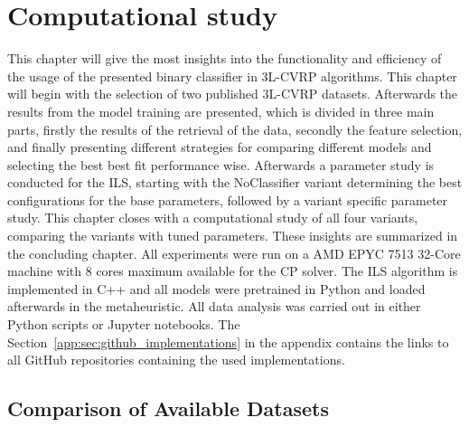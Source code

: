 \chapter{Computational study}
\label{chap:computational_study}
This chapter will give the most insights into the functionality and efficiency of the usage of the presented binary classifier in
\gls{3L-CVRP} algorithms. This chapter will begin with the selection of two published \gls{3L-CVRP} datasets.
Afterwards the results from the model training are presented, which
is divided in three main parts, firstly the results of the retrieval of the data, secondly the feature selection, and finally presenting
different strategies for comparing different models and selecting the best best fit performance wise.
Afterwards a parameter study is conducted for the \gls{ILS}, starting with the NoClassifier variant determining
the best configurations for the base parameters, followed by a variant specific parameter study.
This chapter closes with a computational study of all four variants, comparing the variants with tuned parameters.
These insights are summarized in the concluding chapter. All experiments were run on a AMD EPYC 7513 32-Core machine
with 8 cores maximum available for the \gls{CP} solver. The \gls{ILS} algorithm is implemented in C++ and all models
were pretrained in Python and loaded afterwards in the metaheuristic. All data analysis was carried out in either Python scripts
or Jupyter notebooks. The Section~\ref{app:sec:github_implementations} in the appendix contains the links to all GitHub repositories containing the used implementations.

\section{Comparison of Available Datasets}
\label{sec:dataset_comparison}

